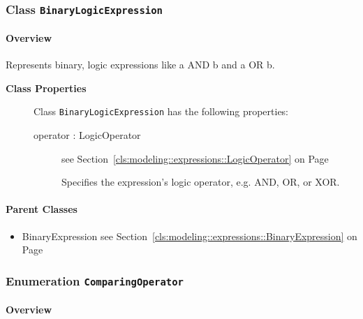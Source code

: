 \subsubsection{\Large{Class \bfseries \texttt{BinaryLogicExpression}\normalfont}}
\label{cls:modeling::expressions::BinaryLogicExpression} 
\paragraph{Overview}

	
			
Represents binary, logic expressions like a AND b and a OR b.	
		
	


\begin{description}

	\item[\textbf{Class Properties}] Class \texttt{BinaryLogicExpression} has the following properties:
	\begin{description}
\item[operator : LogicOperator 	]
see Section~\ref{cls:modeling::expressions::LogicOperator} on Page~\pageref{cls:modeling::expressions::LogicOperator}\hspace{\fill}
\nopagebreak


	
			
Specifies the expression's logic operator, e.g. AND, OR, or XOR.	
		
	
	\end{description}
	
	

\end{description}

\paragraph{Parent Classes}
\begin{itemize}
\item BinaryExpression see Section~\ref{cls:modeling::expressions::BinaryExpression} on Page~\pageref{cls:modeling::expressions::BinaryExpression}\end{itemize}
\subsubsection{\Large{Enumeration \bfseries \texttt{ComparingOperator}\normalfont}}
\label{cls:modeling::expressions::ComparingOperator} 
\paragraph{Overview}
	
